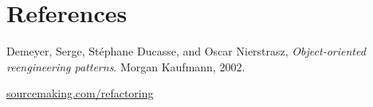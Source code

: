 \documentclass[a4paper]{article}
\begin{document}
\newpage
\section{References}
\begin{thebibliography}{9}

	Demeyer, Serge, St{\'e}phane Ducasse, and Oscar Nierstrasz,
	\emph{Object-oriented reengineering patterns}. 
	Morgan Kaufmann, 
	2002.

	\href{http://sourcemaking.com/refactoring}{sourcemaking.com/refactoring}

\end{thebibliography}
\end{document}

